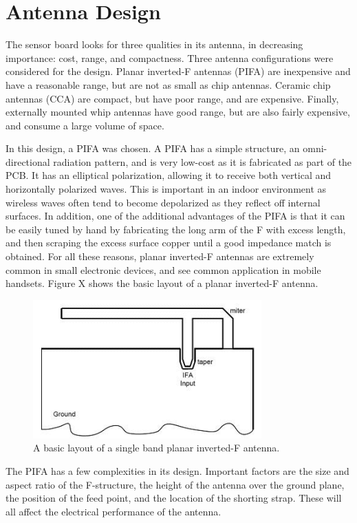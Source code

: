 \section{Antenna Design}

The sensor board looks for three qualities in its antenna, in decreasing importance: cost, range, and compactness. Three antenna configurations were considered for the design. Planar inverted-F antennas (PIFA) are inexpensive and have a reasonable range, but are not as small as chip antennas. Ceramic chip antennas (CCA) are compact, but have poor range, and are expensive. Finally, externally mounted whip antennas have good range, but are also fairly expensive, and consume a large volume of space.

In this design, a PIFA was chosen. A PIFA has a simple structure, an omni-directional radiation pattern, and is very low-cost as it is fabricated as part of the PCB. It has an elliptical polarization, allowing it to receive both vertical and horizontally polarized waves\cite{huynh2000numerical}. This is important in an indoor environment as wireless waves often tend to become depolarized as they reflect off internal surfaces. In addition, one of the additional advantages of the PIFA is that it can be easily tuned by hand by fabricating the long arm of the F with excess length, and then scraping the excess surface copper until a good impedance match is obtained. For all these reasons, planar inverted-F antennas are extremely common in small electronic devices, and see common application in mobile handsets. Figure X shows the basic layout of a planar inverted-F antenna.

\begin{figure}[h]
\centering
\includegraphics[width=0.5\linewidth]{images/pifa}
\caption[PIFA Layout]{A basic layout of a single band planar inverted-F antenna\cite{Rosu}.}
\label{fig:pifa}
\end{figure}


The PIFA has a few complexities in its design. Important factors are the size and aspect ratio of the F-structure, the height of the antenna over the ground plane, the position of the feed point, and the location of the shorting strap. These will all affect the electrical performance of the antenna.

